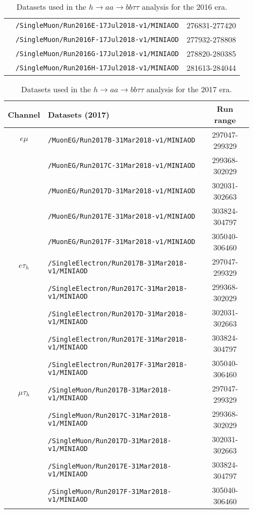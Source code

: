 \begin{table}[ht]
\begin{center}
{\begin{tabular}{|c|l|c|}
    & \texttt{/SingleMuon/Run2016E-17Jul2018-v1/MINIAOD} & 276831-277420\\
    & \texttt{/SingleMuon/Run2016F-17Jul2018-v1/MINIAOD} & 277932-278808\\
    & \texttt{/SingleMuon/Run2016G-17Jul2018-v1/MINIAOD} & 278820-280385\\
    & \texttt{/SingleMuon/Run2016H-17Jul2018-v1/MINIAOD} & 281613-284044\\
    \hline
    \end{tabular}
    }
    \end{center}
    \caption{Datasets used in the $h\rightarrow aa \rightarrow bb\tau\tau$ analysis for the 2016 era.}
    \label{tab:2016datasets}
    \end{table}
    
    \begin{table}[ht]
    \begin{center}
    {\scriptsize
    \begin{tabular}{|c|l|c|}
    \hline
    Channel & Datasets (2017) & Run range\\
    \hline
    $e\mu$ & \texttt{/MuonEG/Run2017B-31Mar2018-v1/MINIAOD} & 297047-299329\\
    & \texttt{/MuonEG/Run2017C-31Mar2018-v1/MINIAOD} & 299368-302029\\
    & \texttt{/MuonEG/Run2017D-31Mar2018-v1/MINIAOD} & 302031-302663\\
    & \texttt{/MuonEG/Run2017E-31Mar2018-v1/MINIAOD} & 303824-304797\\
    & \texttt{/MuonEG/Run2017F-31Mar2018-v1/MINIAOD} & 305040-306460\\
    \hline
    $e\tau_{h}$ & \texttt{/SingleElectron/Run2017B-31Mar2018-v1/MINIAOD} & 297047-299329\\
    & \texttt{/SingleElectron/Run2017C-31Mar2018-v1/MINIAOD} & 299368-302029\\
    & \texttt{/SingleElectron/Run2017D-31Mar2018-v1/MINIAOD} & 302031-302663\\
    & \texttt{/SingleElectron/Run2017E-31Mar2018-v1/MINIAOD} & 303824-304797\\
    & \texttt{/SingleElectron/Run2017F-31Mar2018-v1/MINIAOD} & 305040-306460\\
    \hline
    $\mu\tau_{h}$ & \texttt{/SingleMuon/Run2017B-31Mar2018-v1/MINIAOD} & 297047-299329\\
    & \texttt{/SingleMuon/Run2017C-31Mar2018-v1/MINIAOD} & 299368-302029\\
    & \texttt{/SingleMuon/Run2017D-31Mar2018-v1/MINIAOD} & 302031-302663\\
    & \texttt{/SingleMuon/Run2017E-31Mar2018-v1/MINIAOD} & 303824-304797\\
    & \texttt{/SingleMuon/Run2017F-31Mar2018-v1/MINIAOD} & 305040-306460\\
    \hline
    \end{tabular}
    }
    \end{center}
    \caption{Datasets used in the $h\rightarrow aa \rightarrow bb\tau\tau$ analysis for the 2017 era.}
    \label{tab:2017datasets}
    \end{table}
    
